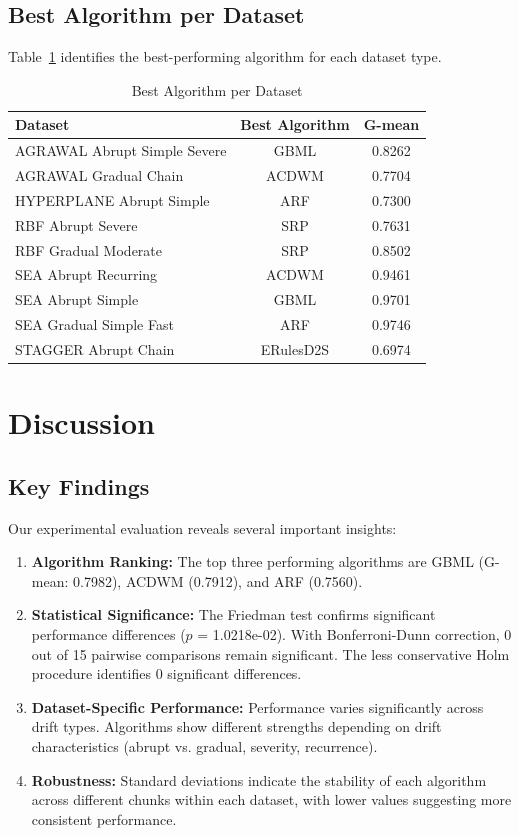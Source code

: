 \documentclass[conference]{IEEEtran}
\begin{document}
\subsection{Best Algorithm per Dataset}

Table~\ref{tab:best} identifies the best-performing algorithm for each dataset type.

\begin{table}[htbp]
\caption{Best Algorithm per Dataset}
\label{tab:best}
\centering
\begin{tabular}{lcc}
\toprule
\textbf{Dataset} & \textbf{Best Algorithm} & \textbf{G-mean} \\
\midrule
AGRAWAL Abrupt Simple Severe & GBML & 0.8262 \\
AGRAWAL Gradual Chain & ACDWM & 0.7704 \\
HYPERPLANE Abrupt Simple & ARF & 0.7300 \\
RBF Abrupt Severe & SRP & 0.7631 \\
RBF Gradual Moderate & SRP & 0.8502 \\
SEA Abrupt Recurring & ACDWM & 0.9461 \\
SEA Abrupt Simple & GBML & 0.9701 \\
SEA Gradual Simple Fast & ARF & 0.9746 \\
STAGGER Abrupt Chain & ERulesD2S & 0.6974 \\
\bottomrule
\end{tabular}
\end{table}

\section{Discussion}

\subsection{Key Findings}

Our experimental evaluation reveals several important insights:

\begin{enumerate}
\item \textbf{Algorithm Ranking:} The top three performing algorithms are GBML (G-mean: 0.7982), ACDWM (0.7912), and ARF (0.7560).

\item \textbf{Statistical Significance:} The Friedman test confirms significant performance differences ($p$ = 1.0218e-02). With Bonferroni-Dunn correction, 0 out of 15 pairwise comparisons remain significant. The less conservative Holm procedure identifies 0 significant differences.

\item \textbf{Dataset-Specific Performance:} Performance varies significantly across drift types. Algorithms show different strengths depending on drift characteristics (abrupt vs. gradual, severity, recurrence).

\item \textbf{Robustness:} Standard deviations indicate the stability of each algorithm across different chunks within each dataset, with lower values suggesting more consistent performance.
\end{enumerate}
\end{document}
